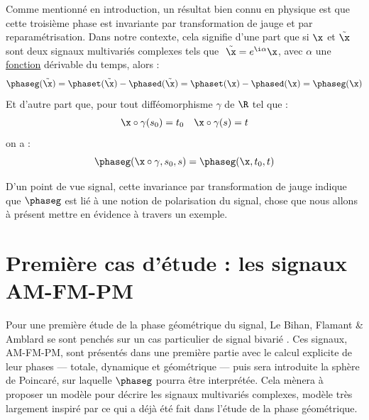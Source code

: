 Comme mentionné en introduction, un résultat bien connu en physique \cite{bohm_geometric_2003,mukunda_quantum_1993,chruscinski_geometric_2004} est que cette troisième phase est invariante par transformation de jauge et par reparamétrisation.
Dans notre contexte, cela signifie d'une part que si $\x$ et $\Tilde{\x}$ sont deux signaux multivariés complexes tels que $\ \Tilde{\x} = e^{\i \alpha}\x$, avec $\alpha$ une \underline{fonction} dérivable du temps, alors :
\begin{align*}
	\phaseg(\Tilde{\x}) &= \phaset(\Tilde{\x}) - \phased(\Tilde{\x})  = \phaset(\x) - \phased(\x) = \phaseg(\x)\\
\end{align*}
Et d'autre part que, pour tout difféomorphisme $\gamma$ de $\R$ tel que :
\begin{align*}
	\x\circ\gamma(s_0)&=t_0  &  \x \circ\gamma(s) = t
\end{align*}
on a :
\[\phaseg(\x \circ \gamma, s_0, s) = \phaseg(\x, t_0, t)\]
\skipl


D'un point de vue signal, cette invariance par transformation de jauge indique que $\phaseg$ est lié à une notion de polarisation du signal, chose que nous allons à présent mettre en évidence à travers un exemple.
\\



\section{Première cas d'étude : les signaux AM-FM-PM} \label{sec:AM-FM-PM}

Pour une première étude de la phase géométrique du signal, Le Bihan, Flamant \& Amblard se sont penchés sur un cas particulier de signal bivarié \cite{flamant_timefrequency_2019,le_bihan_modephysiques_2023, le_bihan_geometric_2024}. Ces signaux, AM-FM-PM, sont présentés dans une première partie avec le calcul explicite de leur phases --- totale, dynamique et géométrique --- puis sera introduite la sphère de Poincaré, sur laquelle $\phaseg$ pourra être interprétée.
Cela mènera à proposer un modèle pour décrire les signaux multivariés complexes, modèle très largement inspiré par ce qui a déjà été fait dans l'étude de la phase géométrique.
\\



